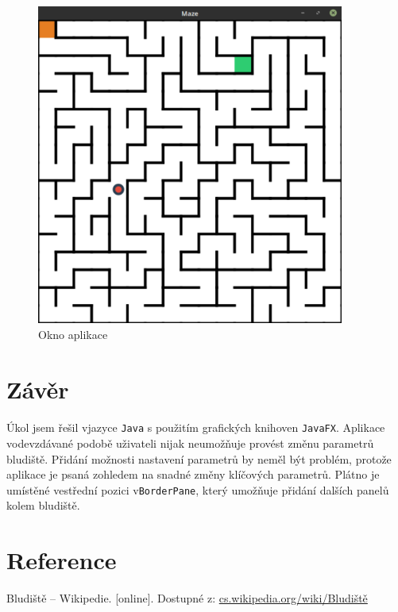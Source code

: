 \documentclass[12pt]{scrartcl}
\begin{document}
\begin{figure}[!ht]
	\centering
	\label{obr:polekolizi}
	\includegraphics[width=0.9\textwidth,natwidth=1,natheight=1]{app_gui.pdf}
	\caption{Okno aplikace}
\end{figure}	

\newpage
\section{Závěr}
\paragraph{}
Úkol jsem řešil v\nobreakspace jazyce \texttt{Java} s použitím grafických knihoven \texttt{JavaFX}.
Aplikace v\nobreakspace odevzdávané podobě uživateli nijak neumožňuje provést změnu parametrů bludiště. Přidání možnosti nastavení parametrů by neměl být problém, protože aplikace je psaná z\nobreakspace ohledem na snadné změny klíčových parametrů. Plátno je umístěné ve\nobreakspace střední pozici v\nobreakspace \texttt{BorderPane}, který umožňuje přidání dalších panelů kolem bludiště.

\section{Reference}

Bludiště – Wikipedie. [online]. Dostupné z: \href{https://cs.wikipedia.org/wiki/Bludiště}{cs.wikipedia.org/wiki/Bludiště}
\end{document}
